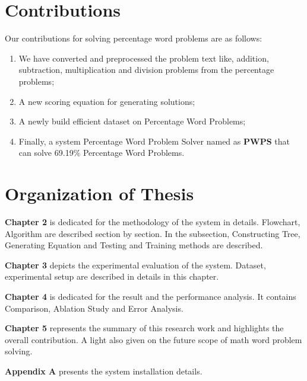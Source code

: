 \documentclass[document.tex]{subfiles}
\begin{document}
%
%

\section{Contributions}
\noindent Our contributions for solving percentage word problems are as follows: 
\begin{enumerate}
	\item We have converted and preprocessed the problem text like, addition, subtraction, multiplication and division problems from the percentage problems; 
	\item A new scoring equation for generating solutions;
	\item A newly build efficient dataset on Percentage Word Problems; 
	\item Finally, a system Percentage Word Problem Solver named as \textbf{PWPS} that can solve 69.19\% Percentage Word Problems.
\end{enumerate}

\section{Organization of Thesis}
\noindent \textbf{Chapter 2} is dedicated for the methodology of the system in details. Flowchart, Algorithm are described section by section. In the subsection, Constructing Tree, Generating Equation and Testing and Training methods are described.

\noindent \textbf{Chapter 3} depicts the experimental evaluation of the system. Dataset, experimental setup are described in details in this chapter.


\noindent \textbf{Chapter 4} is dedicated for the result and the performance analysis. It contains Comparison, Ablation Study and Error Analysis.


\noindent \textbf{Chapter 5} represents the summary of this research work and highlights the overall contribution. A light also given on the future scope of math word problem solving.


\noindent \textbf{Appendix A} presents the system installation details.
\end{document}
